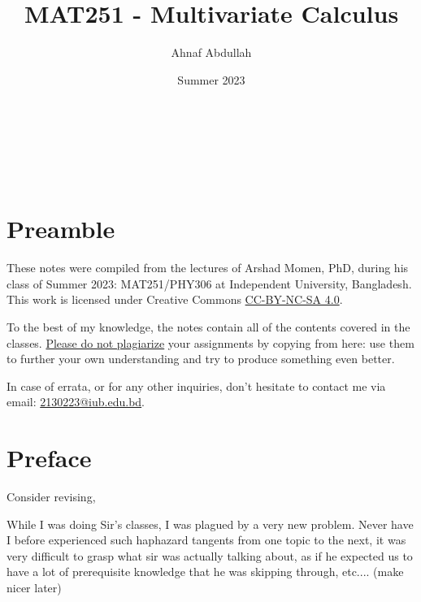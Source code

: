 \documentclass[14pt]{article}
\title{MAT251 - Multivariate Calculus}
\author{Ahnaf Abdullah}
\date{Summer 2023}
\makeatletter
\renewcommand\maketitle{
	{\raggedright %
		\begin{center}
			{\fontfamily{lmss}\selectfont {\huge \@title }}\\[4ex]
			{\fontfamily{lmss}\selectfont {\large \@author}}\\[2ex]
			{\fontfamily{lmss}\selectfont \@date}\\[6ex]
			
\end{center}}} %
\makeatother
\begin{document}

	\markboth{\thetitle}{\thetitle}
	
	\maketitle
	{
		\selectfont
		\section*{\selectfont Preamble}
		These notes were compiled from the lectures of Arshad Momen, PhD, during his class of Summer 2023: MAT251/PHY306 at Independent University, Bangladesh. This work is licensed under Creative Commons \href{https://creativecommons.org/licenses/by-nc-sa/4.0/}{CC-BY-NC-SA 4.0}. 
		
		To the best of my knowledge, the notes contain all of the contents covered in the classes. \underline{Please do not plagiarize} your assignments by copying from here: use them to further your own understanding and try to produce something even better. 
		
		In case of errata, or for any other inquiries, don't hesitate to contact me via email: \href{mailto:2130223@iub.edu.bd}{2130223@iub.edu.bd}.
	}
	\tableofcontents
	\pagebreak
	\section*{Preface}
	Consider revising,
	
	While I was doing Sir's classes, I was plagued by a very new problem. Never have I before experienced such haphazard tangents from one topic to the next, it was very difficult to grasp what sir was actually talking about, as if he expected us to have a lot of prerequisite knowledge that he was skipping through, etc.... (make nicer later)
	
\end{document}
